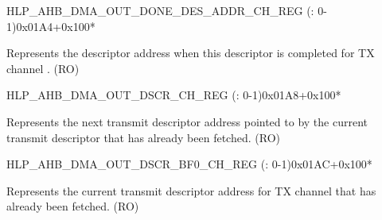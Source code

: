 \begin{register}{H}{LP\_AHB\_DMA\_OUT\_DONE\_DES\_ADDR\_CH\_REG (: 0-1)}{0x01A4+0x100*}\label{regdesc:LPAHBDMAOUTDONEDESADDRCHNREG}
%
\regnewline%
\begin{regdesc}\begin{reglist}
\label{fielddesc:LPAHBDMAOUTDONEDESADDRCHN}\item [LP\_AHB\_DMA\_OUT\_DONE\_DES\_ADDR\_CH\regindex{n}] Represents the descriptor address when this descriptor is completed for TX channel . (RO)
\end{reglist}\end{regdesc}
\end{register}


\begin{register}{H}{LP\_AHB\_DMA\_OUT\_DSCR\_CH\_REG (: 0-1)}{0x01A8+0x100*}\label{regdesc:LPAHBDMAOUTDSCRCHNREG}
%
\regnewline%
\begin{regdesc}\begin{reglist}
\label{fielddesc:LPAHBDMAOUTLINKDSCRCHN}\item [LP\_AHB\_DMA\_OUTLINK\_DSCR\_CH\regindex{n}] Represents the next transmit descriptor address pointed to by the current transmit descriptor that has already been fetched. (RO)
\end{reglist}\end{regdesc}
\end{register}


\begin{register}{H}{LP\_AHB\_DMA\_OUT\_DSCR\_BF0\_CH\_REG (: 0-1)}{0x01AC+0x100*}\label{regdesc:LPAHBDMAOUTDSCRBF0CHNREG}
%
\regnewline%
\begin{regdesc}\begin{reglist}
\label{fielddesc:LPAHBDMAOUTLINKDSCRBF0CHN}\item [LP\_AHB\_DMA\_OUTLINK\_DSCR\_BF0\_CH\regindex{n}] Represents the current transmit descriptor address for TX channel  that has already been fetched. (RO)
\end{reglist}\end{regdesc}
\end{register}


